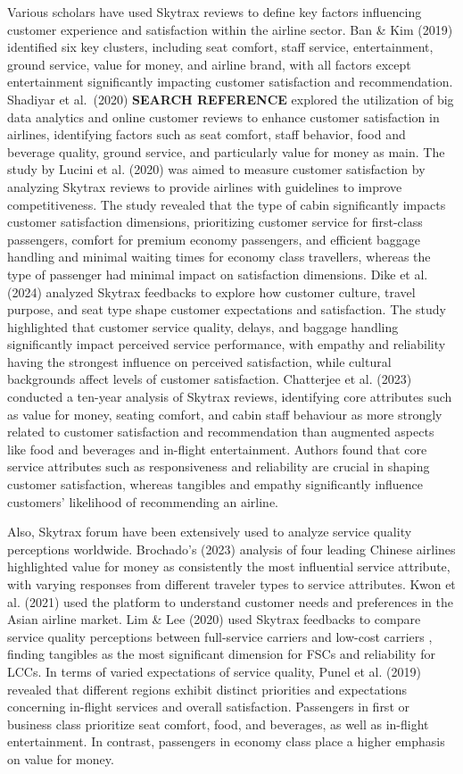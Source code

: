 \documentclass[
]{agujournal2019}
\begin{document}
Various scholars have used Skytrax reviews to define key factors
influencing customer experience and satisfaction within the airline
sector. Ban \& Kim (2019) identified six key clusters, including seat
comfort, staff service, entertainment, ground service, value for money,
and airline brand, with all factors except entertainment significantly
impacting customer satisfaction and recommendation. Shadiyar et
al.~(2020) \textbf{SEARCH REFERENCE} explored the utilization of big
data analytics and online customer reviews to enhance customer
satisfaction in airlines, identifying factors such as seat comfort,
staff behavior, food and beverage quality, ground service, and
particularly value for money as main. The study by Lucini et al. (2020)
was aimed to measure customer satisfaction by analyzing Skytrax reviews
to provide airlines with guidelines to improve competitiveness. The
study revealed that the type of cabin significantly impacts customer
satisfaction dimensions, prioritizing customer service for first-class
passengers, comfort for premium economy passengers, and efficient
baggage handling and minimal waiting times for economy class travellers,
whereas the type of passenger had minimal impact on satisfaction
dimensions. Dike et al. (2024) analyzed Skytrax feedbacks to explore how
customer culture, travel purpose, and seat type shape customer
expectations and satisfaction. The study highlighted that customer
service quality, delays, and baggage handling significantly impact
perceived service performance, with empathy and reliability having the
strongest influence on perceived satisfaction, while cultural
backgrounds affect levels of customer satisfaction. Chatterjee et al.
(2023) conducted a ten-year analysis of Skytrax reviews, identifying
core attributes such as value for money, seating comfort, and cabin
staff behaviour as more strongly related to customer satisfaction and
recommendation than augmented aspects like food and beverages and
in-flight entertainment. Authors found that core service attributes such
as responsiveness and reliability are crucial in shaping customer
satisfaction, whereas tangibles and empathy significantly influence
customers' likelihood of recommending an airline.

Also, Skytrax forum have been extensively used to analyze service
quality perceptions worldwide. Brochado's (2023) analysis of four
leading Chinese airlines highlighted value for money as consistently the
most influential service attribute, with varying responses from
different traveler types to service attributes. Kwon et al. (2021) used
the platform to understand customer needs and preferences in the Asian
airline market. Lim \& Lee (2020) used Skytrax feedbacks to compare
service quality perceptions between full-service carriers and low-cost
carriers , finding tangibles as the most significant dimension for FSCs
and reliability for LCCs. In terms of varied expectations of service
quality, Punel et al. (2019) revealed that different regions exhibit
distinct priorities and expectations concerning in-flight services and
overall satisfaction. Passengers in first or business class prioritize
seat comfort, food, and beverages, as well as in-flight entertainment.
In contrast, passengers in economy class place a higher emphasis on
value for money.
\end{document}
